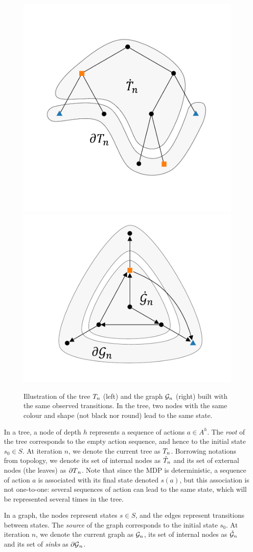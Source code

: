 \documentclass[runningheads]{llncs}
\begin{document}
\begin{figure}[tp]
	\centering
	\includegraphics[trim={1.8cm 2.2cm 1.9cm 2.7cm}, clip,width=0.46\linewidth]{img/tree_1}
	\hfill
	\includegraphics[trim={1.8cm 1.2cm 1.9cm 0.8cm}, clip,width=0.46\linewidth]{img/graph_1}
	\caption{Illustration of the tree $T_n$ (left) and the graph $\mathcal{G}_n$ (right) built with the same observed transitions. In the tree, two nodes with the same colour and shape (not black nor round) lead to the same state.}
	\label{fig:structures}
\end{figure}

In a tree, a node of depth $h$ represents a sequence of actions $a\in A^h$. The \textit{root} of the tree corresponds to the empty action sequence, and hence to the initial state $s_0\in S$. At iteration $n$, we denote the current tree as $T_n$. Borrowing notations from topology, we denote its set of internal nodes as $\mathring{T}_n$ and its set of external nodes (the leaves) as ${\partial T}_n$. Note that since the MDP is deterministic, a sequence of action $a$ is associated with its final state denoted $s(a)$, but this association is not one-to-one: several sequences of action can lead to the same state, which will be represented several times in the tree.

In a graph, the nodes represent states $s\in S$, and the edges represent transitions between states. The \textit{source} of the graph corresponds to the initial state $s_0$. At iteration $n$, we denote the current graph as $\mathcal{G}_n$, its set of internal nodes as $\mathring{\mathcal{G}}_n$ and its set of \textit{sinks} as ${\partial \mathcal{G}}_n$.
\end{document}
